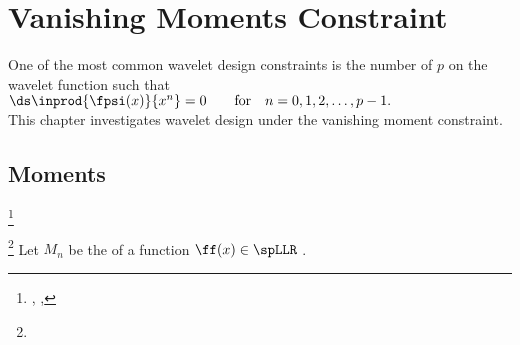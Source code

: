 ﻿%

\chapter{Vanishing Moments Constraint}
\label{chp:vanish}
One of the most common wavelet design constraints is 
the number of  $p$ on the wavelet function such that
  \\\indentx$\ds\inprod{\fpsi(x)}{x^n}=0 \qquad\text{for}\quad n=0,1,2,\ldots,p-1.$\\
This chapter investigates wavelet design under the vanishing moment constraint.

\section{Moments}
\label{sec:vanish}
\begin{definition}
\footnote{
  ,
  ,
  }
\label{def:Mn}
\end{definition}

\begin{definition}
\footnote{
  }
\label{def:vanish}
Let $M_n$ be the   of a function $\ff(x)\in\spLLR$ .
\end{definition}

